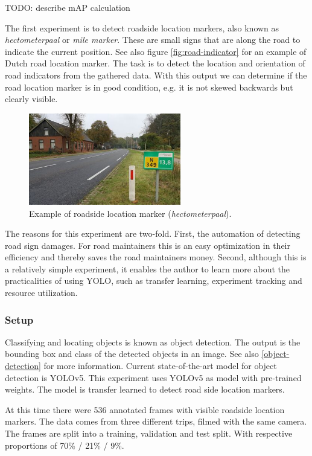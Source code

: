 TODO: describe mAP calculation

The first experiment is to detect roadside location markers, also known as \textit{hectometerpaal} or \textit{mile marker}. These are  small signs that are along the road to indicate the current position. See also figure \ref{fig:road-indicator} for an example of Dutch road location marker. The task is to detect the location and orientation of road indicators from the gathered data. With this output we can determine if the road location marker is in good condition, e.g. it is not skewed backwards but clearly visible.

\begin{figure}[ht]
\begin{center}
\includegraphics[height=4cm,keepaspectratio]{images/5_multimodal_fusion/example_hectometer.jpeg}
\end{center}
\caption{Example of roadside location marker (\textit{hectometerpaal}).}
\end{figure}


The reasons for this experiment are two-fold. First, the automation of detecting road sign damages. For road maintainers this is an easy optimization in their efficiency and thereby saves the road maintainers money. Second, although this is a relatively simple experiment, it enables the author to learn more about the practicalities of using YOLO, such as transfer learning, experiment tracking and resource utilization.


\subsubsection{Setup}
Classifying and locating objects is known as object detection. The output is the bounding box and class of the detected objects in an image. See also \ref{object-detection} for more information. Current state-of-the-art model for object detection is YOLOv5. This experiment uses YOLOv5 as model with pre-trained weights. The model is transfer learned to detect road side location markers. 

At this time there were 536 annotated frames with visible roadside location markers. The data comes from three different trips, filmed with the same camera. The frames are split into a training, validation and test split. With respective proportions of 70\% / 21\% / 9\%. 


